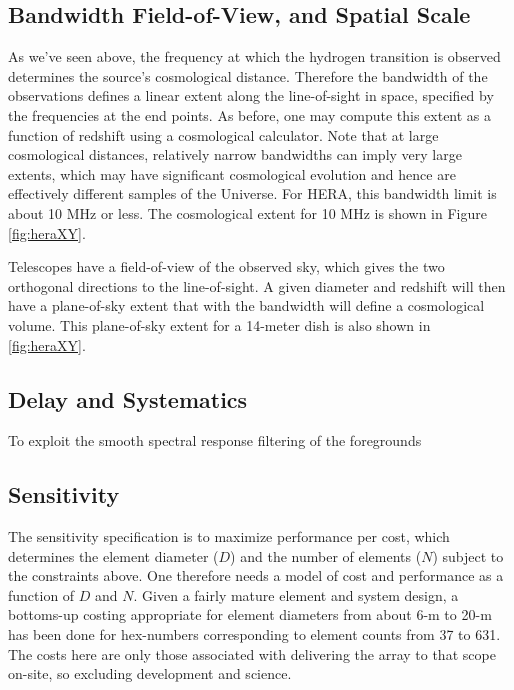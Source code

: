 \documentclass[ars]{copernicus}
\begin{document}
\subsection{Bandwidth Field-of-View, and Spatial Scale}
As we've seen above, the frequency at which the hydrogen transition is observed
determines the source's cosmological distance. Therefore the bandwidth of the
observations defines a linear extent along the line-of-sight in space, specified by
the frequencies at the end points. As before, one may compute this extent as a
function of redshift using a cosmological calculator. Note that at large cosmological
distances, relatively narrow bandwidths can imply very large extents, which may have
significant cosmological evolution and hence are effectively different samples of the
Universe. For HERA, this bandwidth limit is about 10 MHz or less. The cosmological
extent for 10 MHz is shown in Figure \ref{fig:heraXY}.

Telescopes have a field-of-view of the observed sky, which gives the two orthogonal
directions to the line-of-sight. A given diameter and redshift will then have a
plane-of-sky extent that with the bandwidth will define a cosmological volume. This
plane-of-sky extent for a 14-meter dish is also shown in \ref{fig:heraXY}.

\subsection{Delay and Systematics}
To exploit the smooth spectral response filtering of the foregrounds


\subsection{Sensitivity}
The sensitivity specification is to maximize performance per cost, which determines the element 
diameter ($D$) and the number of elements ($N$) subject to the constraints above.  One therefore 
needs a model of cost and performance as a function of $D$ and $N$.  Given a fairly mature element
and system design, a bottoms-up costing appropriate for element diameters from about 6-m to 20-m 
has been done for hex-numbers corresponding to element counts from 37 to 631.  The costs here
are only those associated with delivering the array to that scope on-site, so excluding development and
science.
\end{document}
